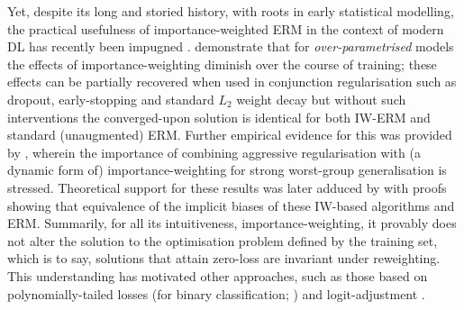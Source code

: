 Yet, despite its long and storied history, with roots in early statistical modelling, the practical
usefulness of importance-weighted \ac{ERM} in the context of modern \acf{DL} has recently been
impugned \citep{byrd2019effect, zhai2022understanding}.
%
\cite{byrd2019effect} demonstrate that for \emph{over-parametrised} models the effects of
importance-weighting diminish over the course of training; these effects can be partially recovered
when used in conjunction regularisation such as dropout, early-stopping and standard \(L_2\) weight
decay but without such interventions the converged-upon solution is identical for both
\ac{IW}-\ac{ERM} and standard (unaugmented) \ac{ERM}. 
%
Further empirical evidence for this was provided by \cite{sagawa2019distributionally}, wherein the
importance of combining aggressive regularisation with (a dynamic form of) importance-weighting for
strong worst-group generalisation is stressed.
%
Theoretical support for these results was later adduced by \cite{zhai2022understanding} with proofs
showing that equivalence of the implicit biases of these \ac{IW}-based algorithms and \ac{ERM}.
%
Summarily, for all its intuitiveness, importance-weighting, it provably does not alter the solution
to the optimisation problem defined by the training set, which is to say, solutions that attain
zero-loss are invariant under reweighting.
%
This understanding has motivated other approaches, such as those based on polynomially-tailed
losses (for binary classification; \cite{wang2021importance}) and logit-adjustment
\citep{menon2020long}.
%


